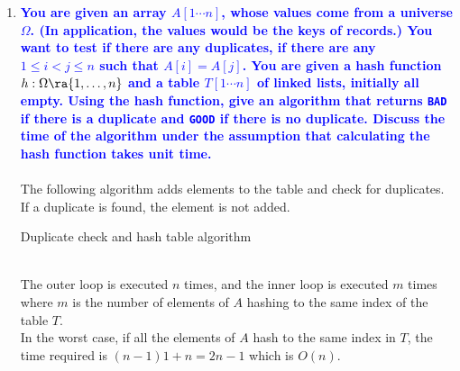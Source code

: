 \documentclass[11pt]{article}
\begin{document}
\begin{enumerate}
\item \textbf{\textcolor{blue}{You are given an array $A[1\cdots n]$, 
whose values come from a universe $\Omega$. (In application, the values 
would be the keys of records.) You want to test if there are any
duplicates, if there are any $1\leq i < j \leq n$ such that
$A[i]=A[j]$.  You are given a hash function $h:\Omega\ra \{1,\ldots,n\}$
and a table $T[1\cdots n]$ of linked lists, initially all empty.
Using the hash function,  give an algorithm that returns {\tt BAD}
if there is a duplicate and {\tt GOOD} if there is no duplicate.
Discuss the time of the algorithm under the assumption that
calculating the hash function takes unit time.}}
    \\\\ The following algorithm adds elements to the table and check for duplicates.
    \\ If a duplicate is found, the element is not added.
    \\
    \begin{algorithm}[H]
        \caption{Duplicate check and hash table algorithm}
    \end{algorithm}
    \\ The outer loop is executed $n$ times, and the inner loop is executed $m$ times where
    $m$ is the number of elements of $A$ hashing to the same index of the table $T$.
    \\ In the worst case, if all the elements of $A$ hash to the same index in $T$, 
    the time required is $(n-1)1 + n = 2n - 1$ which is $O(n)$.
    

\end{enumerate}
\end{document}
